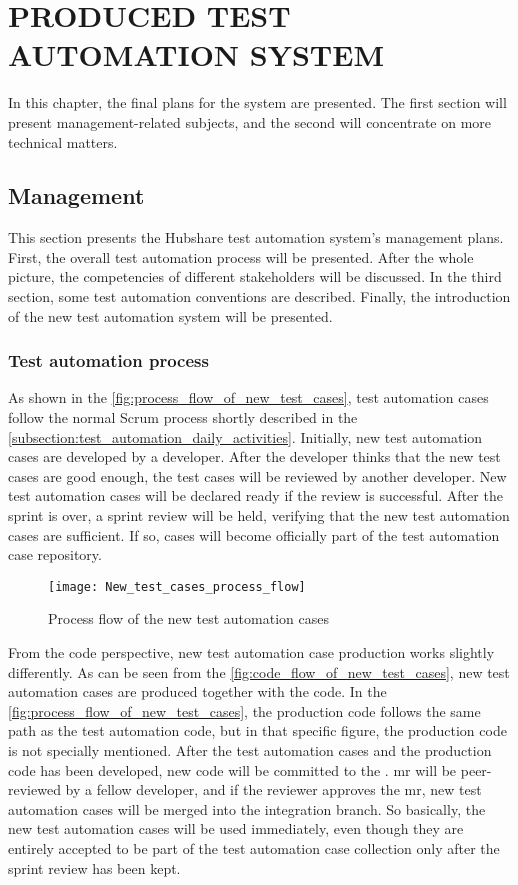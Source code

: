 \chapter{PRODUCED TEST AUTOMATION SYSTEM}\label{chapter:produced_test_automation_system}
In this chapter, the final plans for the system are presented. The first section will present management-related subjects, and the second will concentrate on more technical matters.

\section{Management}
This section presents the Hubshare test automation system's management plans. First, the overall test automation process will be presented. After the whole picture, the competencies of different stakeholders will be discussed. In the third section, some test automation conventions are described. Finally, the introduction of the new test automation system will be presented.

\subsection{Test automation process}
As shown in the \autoref{fig:process_flow_of_new_test_cases}, test automation cases follow the normal Scrum process shortly described in the \autoref{subsection:test_automation_daily_activities}. Initially, new test automation cases are developed by a developer. After the developer thinks that the new test cases are good enough, the test cases will be reviewed by another developer. New test automation cases will be declared ready if the review is successful. After the sprint is over, a sprint review will be held, verifying that the new test automation cases are sufficient. If so, cases will become officially part of the test automation case repository.

\begin{figure}
	\centering
	\texttt{[image: New\_test\_cases\_process\_flow]}
	\caption{Process flow of the new test automation cases}
	\label{fig:process_flow_of_new_test_cases}
\end{figure}

From the code perspective, new test automation case production works slightly differently. As can be seen from the \autoref{fig:code_flow_of_new_test_cases}, new test automation cases are produced together with the code. In the \autoref{fig:process_flow_of_new_test_cases}, the production code follows the same path as the test automation code, but in that specific figure, the production code is not specially mentioned. After the test automation cases and the production code has been developed, new code will be committed to the . \gls{mr} will be peer-reviewed by a fellow developer, and if the reviewer approves the \gls{mr}, new test automation cases will be merged into the integration branch. So basically, the new test automation cases will be used immediately, even though they are entirely accepted to be part of the test automation case collection only after the sprint review has been kept.

